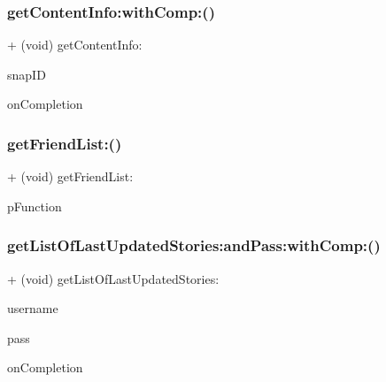 \subsubsection{\texorpdfstring{get\+Content\+Info\+:with\+Comp\+:()}{getContentInfo:withComp:()}}
{\footnotesize\ttfamily + (void) get\+Content\+Info\+: \begin{DoxyParamCaption}\item[{(N\+S\+String $\ast$)}]{snap\+ID }\item[{withComp:(void($^\wedge$)(B\+O\+OL, \hyperlink{interface_snap}{Snap} $\ast$))}]{on\+Completion }\end{DoxyParamCaption}}

\hypertarget{interface_get_a7259a1bb988bb688fb7696beb238f654}{}\label{interface_get_a7259a1bb988bb688fb7696beb238f654} 
\subsubsection{\texorpdfstring{get\+Friend\+List\+:()}{getFriendList:()}}
{\footnotesize\ttfamily + (void) get\+Friend\+List\+: \begin{DoxyParamCaption}\item[{(void($^\wedge$)(B\+O\+OL, N\+S\+Array $\ast$))}]{p\+Function }\end{DoxyParamCaption}}

\hypertarget{interface_get_a294eb503a9541579ae174d43d506766c}{}\label{interface_get_a294eb503a9541579ae174d43d506766c} 
\subsubsection{\texorpdfstring{get\+List\+Of\+Last\+Updated\+Stories\+:and\+Pass\+:with\+Comp\+:()}{getListOfLastUpdatedStories:andPass:withComp:()}}
{\footnotesize\ttfamily + (void) get\+List\+Of\+Last\+Updated\+Stories\+: \begin{DoxyParamCaption}\item[{(N\+S\+String $\ast$)}]{username }\item[{andPass:(N\+S\+String $\ast$)}]{pass }\item[{withComp:(void($^\wedge$)(B\+O\+OL, id))}]{on\+Completion }\end{DoxyParamCaption}}

